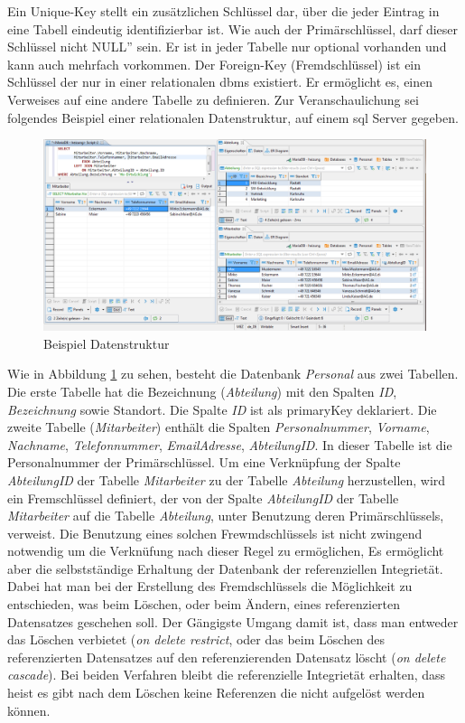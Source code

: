 Ein Unique-Key stellt ein zusätzlichen Schlüssel dar, über die jeder Eintrag in eine Tabell eindeutig identifizierbar ist.
Wie auch der Primärschlüssel, darf dieser Schlüssel nicht \glqq{}NULL'' sein.
Er ist in jeder Tabelle nur optional vorhanden und kann auch mehrfach vorkommen.
Der Foreign-Key (Fremdschlüssel) ist ein Schlüssel der nur in einer relationalen \ac{dbms} existiert.
Er ermöglicht es, einen Verweises auf eine andere Tabelle zu definieren.
Zur Veranschaulichung sei folgendes Beispiel einer relationalen Datenstruktur,
auf einem \ac{sql} Server gegeben.
\begin{figure}[hbt]
  \centering
  \includegraphics[width=\textwidth]{content/hauptteil/theoretischeGrundlagen/rec/exampleSQL.png}
\caption{Beispiel Datenstruktur}
 \label{fig:exampleSQLStructure}%
\end{figure}
Wie in Abbildung \ref{fig:exampleSQLStructure} zu sehen, besteht die Datenbank \emph{Personal} aus zwei Tabellen.
Die erste Tabelle hat die Bezeichnung (\emph{Abteilung}) mit den Spalten \emph{ID}, \emph{Bezeichnung} sowie Standort.
Die Spalte \emph{ID} ist als primaryKey deklariert.
Die zweite Tabelle (\emph{Mitarbeiter}) enthält die Spalten 
\emph{Personalnummer}, \emph{Vorname}, \emph{Nachname}, \emph{Telefonnummer}, \emph{EmailAdresse}, \emph{AbteilungID}.
In dieser Tabelle ist die Personalnummer der Primärschlüssel.
Um eine Verknüpfung der Spalte \emph{AbteilungID} der Tabelle \emph{Mitarbeiter} zu der Tabelle \emph{Abteilung} herzustellen, 
wird ein Fremschlüssel definiert, der von der Spalte \emph{AbteilungID} der Tabelle \emph{Mitarbeiter} auf die Tabelle \emph{Abteilung}, 
unter Benutzung deren Primärschlüssels, verweist.
Die Benutzung eines solchen Frewmdschlüssels ist nicht zwingend notwendig um die Verknüfung nach dieser Regel zu ermöglichen,
Es ermöglicht aber die selbstständige Erhaltung der Datenbank der referenziellen Integrietät. 
Dabei hat man bei der Erstellung des Fremdschlüssels die Möglichkeit zu entschieden, was beim Löschen, oder beim Ändern, eines referenzierten Datensatzes geschehen soll.
Der Gängigste Umgang damit ist, dass man entweder das Löschen verbietet (\emph{on delete restrict},
oder das beim Löschen des referenzierten Datensatzes auf den referenzierenden Datensatz löscht (\emph{on delete cascade}).
Bei beiden Verfahren bleibt die referenzielle Integrietät erhalten, 
dass heist es gibt nach dem Löschen keine Referenzen die nicht aufgelöst werden können.


